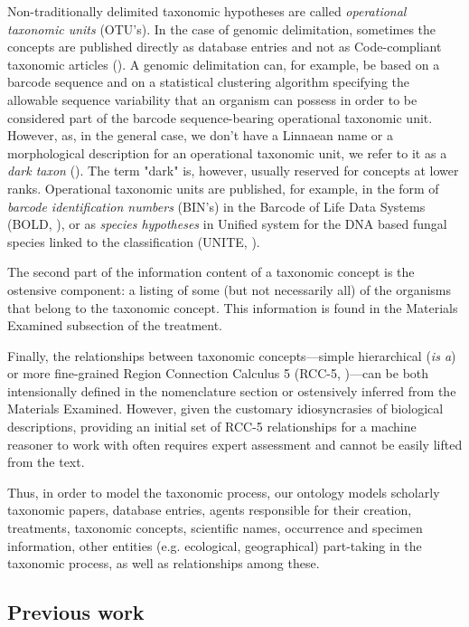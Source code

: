 Non-traditionally delimited taxonomic hypotheses are called \emph{operational taxonomic units} (OTU's). In the case of genomic delimitation, sometimes the concepts are published directly as database entries and not as Code-compliant taxonomic articles (\cite{page_dna_2016}). A genomic delimitation can, for example, be based on a barcode sequence and on a statistical clustering algorithm specifying the allowable sequence variability that an organism can possess in order to be considered part of the barcode sequence-bearing operational taxonomic unit. However, as, in the general case, we don't have a Linnaean name or a morphological description for an operational taxonomic unit, we refer to it as a \emph{dark taxon} (\cite{page_dna_2016}). The term "dark" is, however, usually reserved for concepts at lower ranks. Operational taxonomic units are published, for example, in the form of \emph{barcode identification numbers} (BIN's) in the Barcode of Life Data Systems (BOLD, \cite{ratnasingham_dna-based_2013}), or as \emph{species hypotheses} in Unified system for the DNA based fungal species linked to the classification (UNITE, \cite{koljalg_towards_2013}).

The second part of the information content of a taxonomic concept is the ostensive component: a listing of some (but not necessarily all) of the organisms that belong to the taxonomic concept. This information is found in the Materials Examined subsection of the treatment.

Finally, the relationships between taxonomic concepts---simple hierarchical (\emph{is a}) or more fine-grained Region Connection Calculus 5 (RCC-5, \cite{franz_perspectives:_2009, franz_two_2016})---can be both intensionally defined in the nomenclature section or ostensively inferred from the Materials Examined. However, given the customary idiosyncrasies of biological descriptions, providing an initial set of RCC-5 relationships for a machine reasoner to work with often requires expert assessment and cannot be easily lifted from the text.

Thus, in order to model the taxonomic process, our ontology models scholarly taxonomic papers, database entries, agents responsible for their creation, treatments, taxonomic concepts, scientific names, occurrence and specimen information, other entities (e.g. ecological, geographical) part-taking in the taxonomic process, as well as relationships among these.



\subsection*{Previous work}

